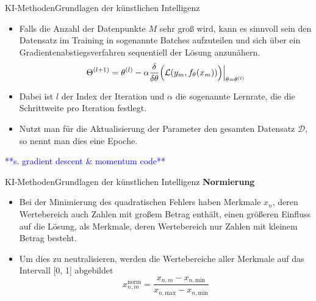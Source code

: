 \documentclass[169, handout	]{THIbeamer} %
\begin{document}
	\begin{frame}{KI-Methoden}{Grundlagen der künstlichen Intelligenz}
	\begin{itemize}
		\item Falls die Anzahl der Datenpunkte $M$ sehr groß wird, kann es sinnvoll sein den Datensatz im Training in sogenannte Batches aufzuteilen und sich über ein Gradientenabstiegsverfahren sequentiell der Lösung anzunähern.
		\begin{equation}
			\Theta ^{(l+1)} = \theta ^{(l)} - \alpha \frac{\delta}{\delta \theta} \Bigl(\mathcal{L} (y_m, f_{\theta} (x_m))\Bigr) \Big| _{\theta = \theta^{(l)}}
		\end{equation}
		\item[] Dabei ist $l$ der Index der Iteration und $\alpha$ die sogenannte Lernrate, die die Schrittweite pro Iteration festlegt.
		\item Nutzt man für die Aktualisierung der Parameter den gesamten Datensatz $\mathcal{D}$, so nennt man dies eine Epoche.
	\end{itemize}
\textcolor{blue}{**s. gradient descent \& momentum code**}
\end{frame}


	\begin{frame}{KI-Methoden}{Grundlagen der künstlichen Intelligenz}
	\textbf{Normierung}
	\begin{itemize}
		\item Bei der Minimierung des quadratischen Fehlers haben Merkmale $x_n$, deren Wertebereich auch Zahlen mit großem Betrag enthält, einen größeren Einfluss auf die Lösung, als Merkmale, deren Wertebereich nur Zahlen mit kleinem Betrag besteht.
		\item Um dies zu neutralisieren, werden die Wertebereiche aller Merkmale auf das Intervall [0, 1] abgebildet
		\begin{equation}
			x_{n,m}^{\text{norm}} = \frac{x_{n,m} - x_{n,\text{min}}}{x_{n,\text{max}} - x_{n,\text{min}}}
		\end{equation}
	\end{itemize}
\end{frame}
\end{document}
